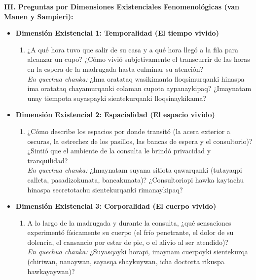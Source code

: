 \vspace{0.3cm}
\noindent\textbf{III. Preguntas por Dimensiones Existenciales Fenomenológicas (van Manen y Sampieri):}
\begin{itemize}
    \item \textbf{Dimensión Existencial 1: Temporalidad (El tiempo vivido)}
    \begin{enumerate}[resume]
        \item ¿A qué hora tuvo que salir de su casa y a qué hora llegó a la fila para alcanzar un cupo? ¿Cómo vivió subjetivamente el transcurrir de las horas en la espera de la madrugada hasta culminar su atención?\\
        \textit{En quechua chanka:} ¿Ima oratataq wasikimanta lloqsimurqanki hinaspa ima oratataq chayamurqanki colaman cupota aypanaykipaq? ¿Imaynatam unay tiempota suyaspayki sientekurqanki lloqsinaykikama?
    \end{enumerate}

    \item \textbf{Dimensión Existencial 2: Espacialidad (El espacio vivido)}
    \begin{enumerate}[resume]
        \item ¿Cómo describe los espacios por donde transitó (la acera exterior a oscuras, la estrechez de los pasillos, las bancas de espera y el consultorio)? ¿Sintió que el ambiente de la consulta le brindó privacidad y tranquilidad?\\
        \textit{En quechua chanka:} ¿Imaynatam suyana sitiota qawarqanki (tutayaqpi calleta, pasadizokunata, bancakunata)? ¿Consultoriopi hawka kaytachu hinaspa secretotachu sientekurqanki rimanaykipaq?
    \end{enumerate}

    \item \textbf{Dimensión Existencial 3: Corporalidad (El cuerpo vivido)}
    \begin{enumerate}[resume]
        \item A lo largo de la madrugada y durante la consulta, ¿qué sensaciones experimentó físicamente su cuerpo (el frío penetrante, el dolor de su dolencia, el cansancio por estar de pie, o el alivio al ser atendido)?\\
        \textit{En quechua chanka:} ¿Suyasqayki horapi, imaynam cuerpoyki sientekurqa (chiriwan, nanaywan, sayasqa shaykuywan, icha doctorta rikuspa hawkayaywan)?
    \end{enumerate}


\end{itemize}
